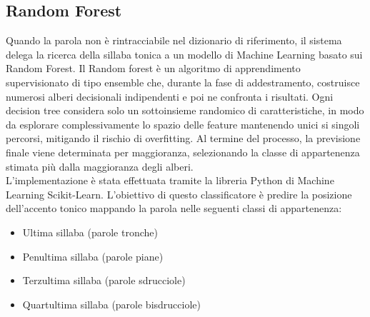 \subsection{Random Forest}
Quando la parola non è rintracciabile nel dizionario di riferimento, il sistema delega la ricerca della sillaba tonica a un modello di Machine Learning 
basato sui Random Forest. Il Random forest è un algoritmo di apprendimento supervisionato di tipo ensemble che, durante la fase di addestramento, 
costruisce numerosi alberi decisionali indipendenti e poi ne confronta i risultati. Ogni decision tree considera solo un sottoinsieme randomico di 
caratteristiche, in modo da esplorare complessivamente lo spazio delle feature mantenendo unici si singoli percorsi, mitigando il rischio di overfitting. 
Al termine del processo, la previsione finale viene determinata per maggioranza, selezionando la classe di appartenenza stimata più dalla maggioranza 
degli alberi.\\
L'implementazione è stata effettuata tramite la libreria Python di Machine Learning Scikit-Learn. L'obiettivo di questo classificatore è predire la 
posizione dell'accento tonico mappando la parola nelle seguenti classi di appartenenza:

\begin{itemize}
      \item Ultima sillaba (parole tronche)
      \item Penultima sillaba (parole piane)
      \item Terzultima sillaba (parole sdrucciole)
      \item Quartultima sillaba (parole bisdrucciole)
\end{itemize}

